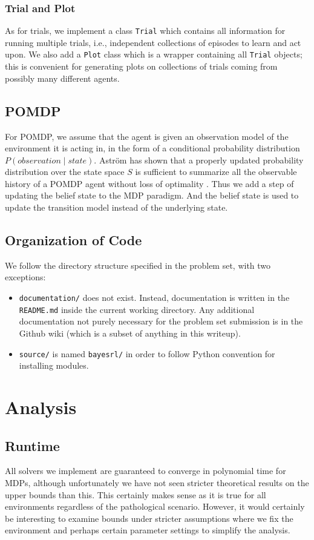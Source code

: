 \documentclass{pset}
\begin{document}
\subsubsection{Trial and Plot}
As for trials, we implement a class \texttt{Trial} which contains all information for running multiple trials, i.e., independent collections of episodes to learn and act upon. We also add a \texttt{Plot} class which is a wrapper containing all \texttt{Trial} objects; this is convenient for generating plots on collections of trials coming from possibly many different agents.

\subsection{POMDP}
For POMDP, we assume that the agent is given an observation model of the
environment it is acting in, in the form of a conditional probability distribution
$P(observation \mid state)$. Astr\"{o}m has shown that a properly updated probability
distribution over the state space $S$ is sufficient to summarize all the observable
history of a POMDP agent without loss of optimality \cite{astrom1965optimal}. 
Thus we add a step of updating the belief state to the MDP paradigm. And the belief state is used to
update the transition model instead of the underlying state.

\subsection{Organization of Code}
We follow the directory structure specified in the problem set, with two
exceptions:
\begin{itemize}
\item \texttt{documentation/} does not exist. Instead, documentation is written
in the \texttt{README.md} inside the current working directory. Any additional
documentation not purely necessary for the problem set submission is in the
Github wiki (which is a subset of anything in this writeup).
\item \texttt{source/} is named \texttt{bayesrl/} in order to follow Python
convention for installing modules.
\end{itemize}

\section{Analysis}

\subsection{Runtime}
All solvers we implement are guaranteed to converge in polynomial time for MDPs,
although unfortunately we have not seen stricter theoretical results on the
upper bounds than this. This certainly makes sense as it is true for all
environments regardless of the pathological scenario. However, it would
certainly be interesting to examine bounds under stricter assumptions where we
fix the environment and perhaps certain parameter settings to simplify the
analysis.
\end{document}
